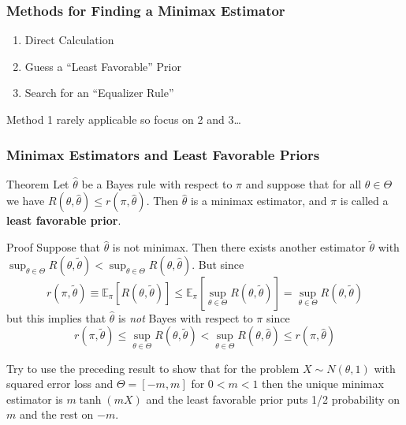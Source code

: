 \begin{frame}
  \frametitle{Methods for Finding a Minimax Estimator}

  \begin{enumerate}
    \item Direct Calculation 
    \item Guess a ``Least Favorable'' Prior
    \item Search for an ``Equalizer Rule''
  \end{enumerate}

  \vspace{2em}
  \hfill\alert{Method 1 rarely applicable so focus on 2 and 3\dots}

\end{frame}
\begin{frame}
  \frametitle{Minimax Estimators and Least Favorable Priors}


  \begin{block}{Theorem}
    \small
    Let $\widehat{\theta}$ be a Bayes rule with respect to $\pi$ and suppose that for all $\theta\in \Theta$ we have $R(\theta,\widehat{\theta}) \leq r(\pi, \widehat{\theta})$.
    Then $\widehat{\theta}$ is a minimax estimator, and $\pi$ is called a \textbf{least favorable prior}.
  \end{block}

  \begin{block}{Proof}
    \small
    Suppose that $\widehat{\theta}$ is not minimax.
    Then there exists another estimator $\widetilde{\theta}$ with $\sup_{\theta\in\Theta} R(\theta, \widetilde{\theta}) < \sup_{\theta\in \Theta} R(\theta, \widehat{\theta})$.
    But since
    \[
      r(\pi, \widetilde{\theta}) \equiv \mathbb{E}_{\pi}\left[ R(\theta,\widetilde{\theta}) \right] \leq \mathbb{E}_{\pi}\left[ \sup_{\theta \in \Theta} R(\theta, \widetilde{\theta}) \right] = \sup_{\theta \in \Theta} R(\theta, \widetilde{\theta})
    \]
    but this implies that $\widehat{\theta}$ is \emph{not} Bayes with respect to $\pi$ since 
    \[
      r(\pi, \widetilde{\theta}) \leq \sup_{\theta\in \Theta} R(\theta, \widetilde{\theta}) < \sup_{\theta \in \Theta} R(\theta, \widehat{\theta}) \leq r(\pi, \widehat{\theta})
    \]
  \end{block}
\end{frame}
\begin{frame}
  Try to use the preceding result to show that for the problem $X\sim N(\theta, 1)$ with squared error loss and $\Theta = [-m, m]$ for $0< m < 1$ then the unique minimax estimator is $m \tanh(mX)$ and the least favorable prior puts 1/2 probability on $m$ and the rest on $-m$.
\end{frame}
